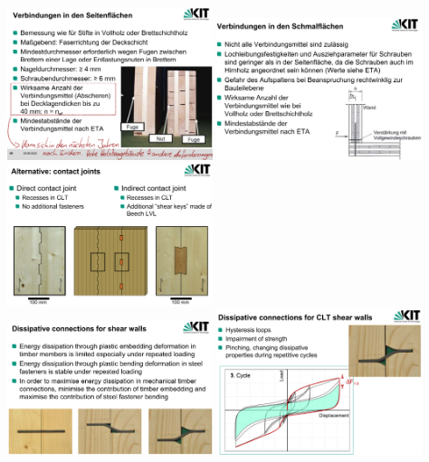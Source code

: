 \documentclass[fleqn,twoside]{article}
\begin{document}
\begin{itemize}
        \includegraphics[width=0.45\textwidth]{Grafiken/CLT-Verbindungen/Verbindungen SeitenflÃ¤chen.png}
        \includegraphics[width=0.45\textwidth]{Grafiken/CLT-Verbindungen/Verbindungen Schmalflaechen.png}\\
        \includegraphics[width=0.45\textwidth]{Grafiken/CLT-Verbindungen/Contact joints.png}\\
        \includegraphics[width=0.45\textwidth]{Grafiken/CLT-Verbindungen/Dissipative joints.png}
        \includegraphics[width=0.45\textwidth]{Grafiken/CLT-Verbindungen/Dissipative joints hysteresis.png}\\
        
    \end{itemize}
\end{document}
